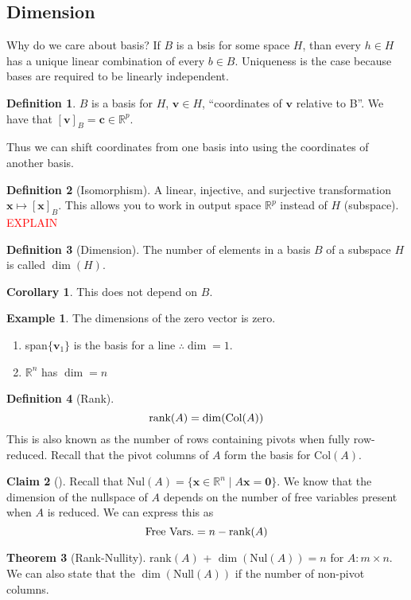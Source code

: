 \documentclass{article}
\numberwithin{equation}{section}
\theoremstyle{definition}
\newtheorem{thm}{Theorem}[subsection]
\newtheorem{defn}{Definition}[subsection]
\newtheorem{cor}{Corollary}[thm]
\newtheorem{ex}[thm]{Example}
\newtheorem{claim}[thm]{Claim}
\newcommand{\V}{\mathbf{v}}
\newcommand{\R}{\mathbb{R}}
\newcommand{\x}{\times}
\theoremstyle{adefn}
\begin{document}
	\subsection{Dimension}
	Why do we care about basis? If $B$ is a bsis for some space $H$, than every $h \in H$ has a unique linear combination of every $b \in B$. Uniqueness is the case because bases are required to be linearly independent. 
	\begin{defn}
		$B$ is a basis for $H$, $\V \in H$, ``coordinates of $\V$ relative to B''. We have that $[\V]_B = \mathbf{c} \in \R^p$.
	\end{defn}
	Thus we can shift coordinates from one basis into using the coordinates of another basis. 
	
	\begin{defn}[Isomorphism]
		A linear, injective, and surjective transformation $\mathbf{x} \mapsto [\mathbf{x}]_B$. This allows you to work in output space $\R^p$ instead of $H$ (subspace). \textcolor{red}{EXPLAIN}
	\end{defn}
	\begin{defn}[Dimension]
		The number of elements in a basis $B$ of a subspace $H$ is called $\dim(H)$. 
	\end{defn}
	\begin{cor}
		This does not depend on $B$. 
	\end{cor}
	\begin{ex} The dimensions of the zero vector is zero. 
		\begin{enumerate}
			\itemsep0em
			\item span$\{\V_1\}$ is the basis for a line $\therefore \dim = 1$.
			\item $\R^n$ has $\dim = n$
		\end{enumerate}
	\end{ex}
	\begin{defn}[Rank]
		$$\hbox{rank}(A) = \dim(\hbox{Col}(A))$$
		This is also known as the number of rows containing pivots when fully row-reduced. Recall that the pivot columns of $A$ form the basis for Col$(A)$. 
	\end{defn}
	\begin{claim}[]
		Recall that Nul$(A) = \{ \mathbf{x} \in \R^n \mid A\mathbf{x} = \mathbf{0} \}$. We know that the dimension of the nullspace of $A$ depends on the number of free variables present when $A$ is reduced. We can express this as 
		$$\text{Free Vars.} = n - \hbox{rank}(A)$$
	\end{claim}
	\begin{thm}[Rank-Nullity]
		rank$(A)$ + $\dim(\text{Nul}(A)) = n$ for $A: m \x n$. We can also state that the $\dim(\text{Null}(A))$ if the number of non-pivot columns. 
	\end{thm}
\end{document}
